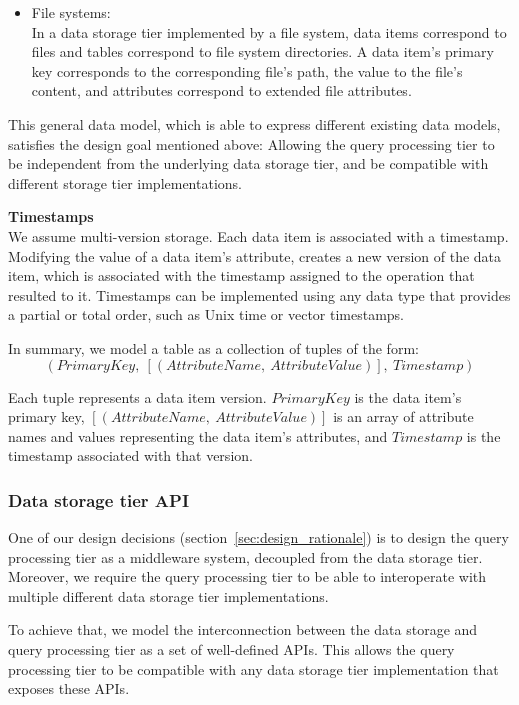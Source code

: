 \begin{itemize}
  \item File systems: \\
  In a data storage tier implemented by a file system, data items correspond to files and tables correspond to file
  system directories.
  A data item's primary key corresponds to the corresponding file's path, the value to the file's content,
  and attributes correspond to extended file attributes.
\end{itemize}

This general data model, which is able to express different existing data models, satisfies the design goal mentioned
above:
Allowing the query processing tier to be independent from the underlying data storage tier, and be compatible with
different storage tier implementations.

\medskip
\noindent
\textbf{Timestamps} \\
We assume multi-version storage.
Each data item is associated with a timestamp.
Modifying the value of a data item's attribute, creates a new version of the data item,
which is associated with the timestamp assigned to the operation that resulted to it.
Timestamps can be implemented using any data type that provides a partial or total order, such as Unix time or vector timestamps.

\medskip
\noindent
In summary, we model a table as a collection of tuples of the form:
\[
  (PrimaryKey,~[(AttributeName,~AttributeValue)],~Timestamp)
\]
\begin{sloppypar}
Each tuple represents a data item version.
$PrimaryKey$ is the data item's primary key, $[(AttributeName,~AttributeValue)]$ is an array of attribute names and values
representing the data item's attributes, and $Timestamp$ is the timestamp associated with that version.
\end{sloppypar}

\subsubsection{Data storage tier API}
\label{sec:storage_tier_api}
One of our design decisions (section~\ref{sec:design_rationale}) is to design the query processing tier as a middleware
system, decoupled from the data storage tier.
Moreover, we require the query processing tier to be able to interoperate with multiple different data storage tier implementations.

To achieve that, we model the interconnection between the data storage and query processing tier as a set of well-defined APIs.
This allows the query processing tier to be compatible with any data storage tier implementation that exposes these APIs.

